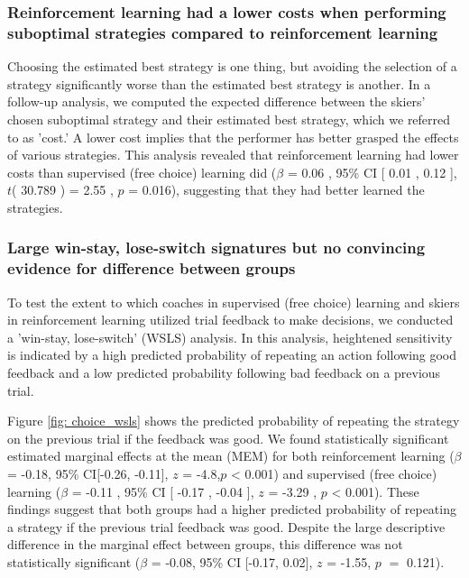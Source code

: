 \subsubsection{Reinforcement learning had a lower costs when performing suboptimal strategies compared to  reinforcement learning}\label{subsubsec3}
Choosing the estimated best strategy is one thing, but avoiding the selection of a strategy significantly worse than the estimated best strategy is another. In a follow-up analysis, we computed the expected difference between the skiers' chosen suboptimal strategy and their estimated best strategy, which we referred to as 'cost.' A lower cost implies that the performer has better grasped the effects of various strategies. This analysis revealed that reinforcement learning had lower costs than supervised (free choice) learning did  ($\beta$ = 0.06 , 95\% CI [ 0.01 ,  0.12 ], $t$( 30.789 ) = 2.55 , $p$  =  0.016), suggesting that they had better learned the strategies.

\subsubsection{Large win-stay, lose-switch signatures but no convincing evidence for difference between groups}\label{wsls}
To test the extent to which coaches in supervised (free choice) learning and skiers in reinforcement learning utilized trial feedback to make decisions, we conducted a 'win-stay, lose-switch' (WSLS) analysis. In this analysis, heightened sensitivity is indicated by a high predicted probability of repeating an action following good feedback and a low predicted probability following bad feedback on a previous trial.

Figure \ref{fig: choice_wsls} shows the predicted probability of repeating the strategy on the previous trial if the feedback was good. We found statistically significant estimated marginal effects at the mean (MEM) for both reinforcement learning  ($\beta$ = -0.18, 95\% CI[-0.26, -0.11], $z$ = -4.8,$p$ < 0.001) and supervised (free choice) learning ($\beta$ = -0.11 , 95\% CI [ -0.17 ,  -0.04 ], $z$ = -3.29 , $p$  <  0.001). These findings suggest that both groups had a higher predicted probability of repeating a strategy if the previous trial feedback was good. Despite the large descriptive difference in the marginal effect between groups, this difference was not statistically  significant ($\beta$ = -0.08, 95\% CI [-0.17, 0.02], $z$ = -1.55, $p$ $=$ 0.121).




